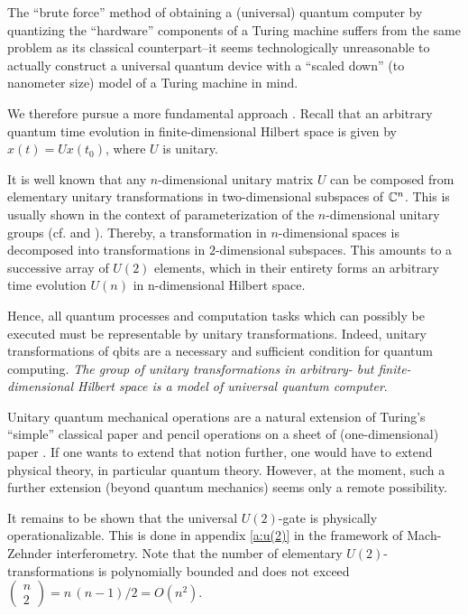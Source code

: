 The ``brute force'' method of obtaining a (universal) quantum
computer \cite{benioff-82a,deutsch,landauer-94}
 by quantizing the ``hardware'' components  of a Turing machine
suffers from the same problem as its classical counterpart--it
seems technologically unreasonable to actually construct a universal
quantum device with
a ``scaled down'' (to nanometer size) model of a Turing machine in
mind.

We therefore pursue a more fundamental approach
\cite{svozil-qct1,svozil-qct2}. Recall that
an arbitrary quantum time evolution in finite-dimensional Hilbert space
 is given by
$x (t) =Ux (t_0) $, where  $U$ is unitary.


It is well known that
any $n$-dimensional unitary matrix $U$ can be composed from elementary
unitary transformations in two-dimensional subspaces of ${\Bbb C}^n$.
This is usually shown in the context of parameterization of the
$n$-dimensional unitary groups
(cf. \cite[chapter 2]{murnaghan} and
\cite{rzbb,reck-94}).
Thereby, a transformation in $n$-dimensional spaces is decomposed into
transformations in $2$-dimensional subspaces.
This amounts to a
successive array of $U(2)$ elements, which in their entirety forms an
arbitrary time evolution
$U(n)$ in n-dimensional Hilbert space.

Hence, all quantum processes and computation tasks which can possibly be
executed must be representable by unitary transformations. Indeed,
unitary
transformations of qbits are a necessary and sufficient condition for
quantum computing. {\em The group of unitary transformations in
arbitrary- but finite-dimensional Hilbert space is a model of
universal quantum computer}.

Unitary quantum mechanical operations are a natural extension of
Turing's
``simple'' classical paper and pencil operations on
a sheet of (one-dimensional) paper \cite[section 9.I]{turing-36}.
If one wants to extend that notion further, one would have to extend
physical
theory, in particular quantum theory. However, at the moment, such a
further extension (beyond quantum mechanics) seems only a remote
possibility.

It remains to be shown that the universal $U(2)$-gate is physically
operationalizable. This is done in appendix
\ref{a:u(2)}
in the framework of Mach-Zehnder interferometry.
Note that the number of elementary $U(2)$-transformations is
polynomially bounded and does not exceed
$\left(
\begin{array}{c}
n\\2
\end{array}
\right) ={n\,(n-1)/ 2} =O(n^2)
$.


